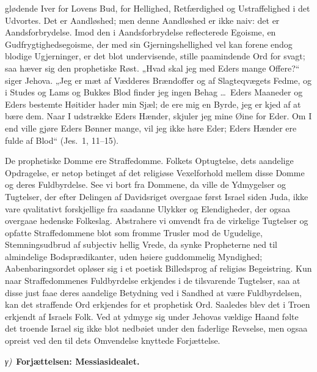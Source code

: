 \documentclass[12pt]{book}
\newcommand{\greekrun}[2]{%
  \medskip\begin{center}{\itshape #1)}\ {\bfseries #2}\end{center}\medskip}
\begin{document}
glødende Iver for Lovens Bud, for Hellighed, Retfærdighed og
Ustraffelighed i det Udvortes. Det er Aandløshed; men denne
Aandløshed er ikke naiv: det er Aandsforbrydelse. Imod den i
Aandsforbrydelse reflecterede Egoisme, en Gudfrygtighedsegoisme, der
med sin Gjerningshellighed vel kan forene endog blodige Ugjerninger,
er det blot undervisende, stille paamindende Ord for svagt; saa
hæver sig den prophetiske Røst. „Hvad skal jeg med Eders mange
Offere?“ siger Jehova. „Jeg er mæt af Vædderes Brændoffer og af
Slagteqvægets Fedme, og i Studes og Lams og Bukkes Blod finder jeg
ingen Behag \dots\ Eders Maaneder og Eders bestemte Høitider hader
min Sjæl; de ere mig en Byrde, jeg er kjed af at bære dem. Naar I
udstrække Eders Hænder, skjuler jeg mine Øine for Eder.
Om I end ville gjøre Eders Bønner mange, vil jeg ikke høre Eder;
Eders Hænder ere fulde af Blod“ (Jes.\ 1, 11--15).

De prophetiske Domme ere Straffedomme. Folkets Optugtelse, dets
aandelige Opdragelse, er netop betinget af det religiøse
Vexelforhold mellem disse Domme og deres Fuldbyrdelse. See vi bort
fra Dommene, da ville de Ydmygelser og Tugtelser, der efter Delingen
af Davidsriget overgaae først Israel siden Juda, ikke vare
qvalitativt forskjellige fra saadanne Ulykker og Elendigheder, der
ogsaa overgaae hedenske Folkeslag. Abstrahere vi omvendt fra de
virkelige Tugtelser og opfatte Straffedommene blot som fromme
Trusler mod de Ugudelige, Stemningsudbrud af subjectiv hellig Vrede,
da synke Propheterne ned til almindelige Bodsprædikanter, uden
høiere guddommelig Myndighed; Aabenbaringsordet opløser sig i et
poetisk Billedsprog af religiøs Begeistring. Kun naar
Straffedommenes Fuldbyrdelse erkjendes i de tilsvarende Tugtelser,
saa at disse just faae deres aandelige Betydning ved i Sandhed at
være Fuldbyrdelsen, kan det straffende Ord erkjendes for et
prophetisk Ord. Saaledes blev det i Troen erkjendt af Israels Folk.
Ved at ydmyge sig under Jehovas vældige Haand følte det troende
Israel sig ikke blot nedbøiet under den faderlige Revselse, men
ogsaa opreist ved den til dets Omvendelse knyttede Forjættelse.

\greekrun{γ}{Forjættelsen: Messiasidealet.}
\end{document}
